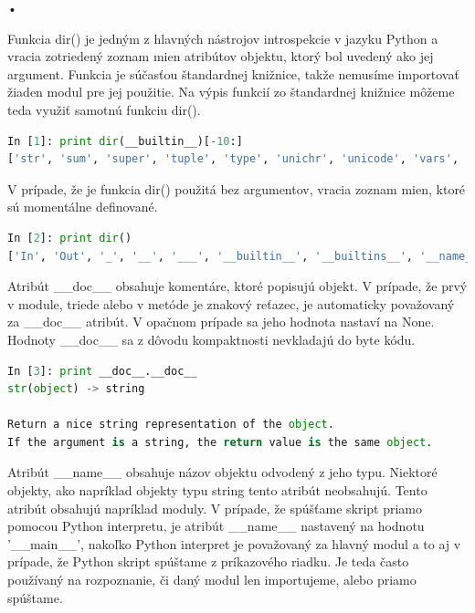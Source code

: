 \documentclass[11pt,oneside,final]{fithesis2}
\begin{document}
\begin{list}{•}{}
		\item 
			Funkcia dir() je jedným z hlavných nástrojov introspekcie v jazyku Python a vracia zotriedený zoznam mien atribútov objektu, ktorý bol uvedený ako jej argument. Funkcia je súčasťou štandardnej knižnice, takže nemusíme importovať žiaden modul pre jej použitie. Na výpis funkcií zo štandardnej knižnice môžeme teda využiť samotnú funkciu dir().
			

\begin{lstlisting}[language=python]
In [1]: print dir(__builtin__)[-10:]
['str', 'sum', 'super', 'tuple', 'type', 'unichr', 'unicode', 'vars', 'xrange', 'zip']
\end{lstlisting}

			 V prípade, že je funkcia dir() použitá bez argumentov, vracia zoznam mien, ktoré sú momentálne definované.

\begin{lstlisting}[language=python]
In [2]: print dir()
['In', 'Out', '_', '__', '___', '__builtin__', '__builtins__', '__name__', '_dh', '_i', '_i1', '_i2', '_ih', '_ii', '_iii', '_oh', '_sh', 'exit', 'get_ipython', 'help', 'quit']

\end{lstlisting}
	

		\item 
			Atribút \_\_doc\_\_ obsahuje komentáre, ktoré popisujú objekt. V prípade, že prvý v module, triede alebo v metóde je znakový reťazec, je automaticky považovaný za \_\_doc\_\_ atribút. V opačnom prípade sa jeho hodnota nastaví na None. Hodnoty \_\_doc\_\_ sa z dôvodu kompaktnosti nevkladajú do byte kódu.
			
\begin{lstlisting}[language=python]
In [3]: print __doc__.__doc__
str(object) -> string

Return a nice string representation of the object.
If the argument is a string, the return value is the same object.
\end{lstlisting}

		\item 
			Atribút \_\_name\_\_ obsahuje názov objektu odvodený z jeho typu. Niektoré objekty, ako napríklad objekty typu string tento atribút neobsahujú. Tento atribút obsahujú napríklad moduly. V prípade, že spúšťame skript priamo pomocou Python interpretu, je atribút \_\_name\_\_ nastavený na hodnotu '\_\_main\_\_', nakoľko Python interpret je považovaný za hlavný modul a to aj v prípade, že Python skript spúštame z príkazového riadku. Je teda často používaný na rozpoznanie, či daný modul len importujeme, alebo priamo spúštame.
	

\end{list}
\end{document}

